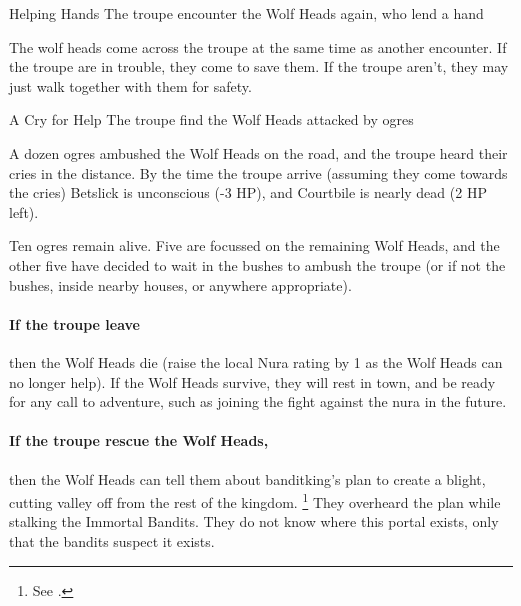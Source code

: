 {\squash Helping Hands}%
{The troupe encounter the Wolf Heads again, who lend a hand}%

The wolf heads come across the troupe at the same time as another encounter.
If the troupe are in trouble, they come to save them.
If the troupe aren't, they may just walk together with them for safety.

{A Cry for Help}%
{The troupe find the Wolf Heads attacked by ogres}%

A dozen ogres ambushed the Wolf Heads on the road, and the troupe heard their cries in the distance.
By the time the troupe arrive (assuming they come towards the cries) Betslick is unconscious (-3 HP), and Courtbile is nearly dead (2 HP left).

Ten ogres remain alive.
Five are focussed on the remaining Wolf Heads, and the other five have decided to wait in the bushes to ambush the troupe (or if not the bushes, inside nearby houses, or anywhere appropriate).

\paragraph{\N If the troupe leave}
then the Wolf Heads die (raise the local Nura rating by 1 as the Wolf Heads can no longer help).
If the Wolf Heads survive, they will rest in \gls{town}, and be ready for any call to adventure, such as joining the fight against the nura in the future.

\paragraph{If the troupe rescue the Wolf Heads,}
then the Wolf Heads can tell them about \gls{banditking}'s plan to create a blight, cutting \gls{valley} off from the rest of the kingdom.%
\footnote{See .}
They overheard the plan while stalking the Immortal Bandits.
They do not know where this portal exists, only that the bandits suspect it exists.



\stopcontents[sq]


